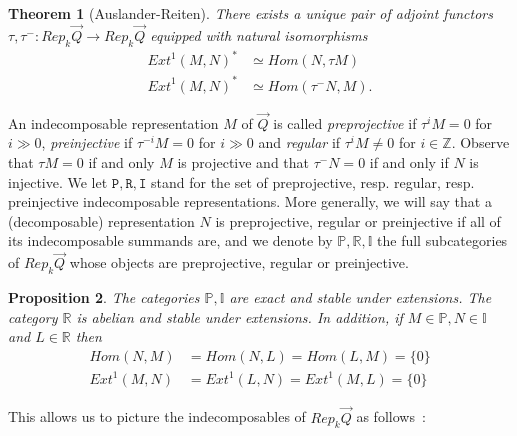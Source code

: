 \documentclass[a4paper,10pt]{amsart}
\def\Z{\mathbb{Z}}
\newtheorem{theo}{\bf{Theorem}}[section]
\newtheorem{prop}[theo]{Proposition}
\numberwithin{equation}{section}
\begin{document}
\begin{theo}[Auslander-Reiten]\label{T:AR} There exists a unique pair of adjoint functors $\tau,\tau^-: Rep_k\vec{Q} \to Rep_k\vec{Q}$ equipped with natural isomorphisms
\begin{align*}
{Ext}^1(M,N)^* &\simeq {Hom}(N,\tau M)\\
{Ext}^1(M,N)^* &\simeq {Hom}(\tau^-N, M).
\end{align*}
\end{theo}

\vspace{.1in}

An indecomposable representation $M$ of $\vec{Q}$ is called \textit{preprojective} if $\tau^i M =0$ for $i \gg 0$,
\textit{preinjective} if $\tau^{-i} M =0$ for $i \gg 0$ and \textit{regular} if $\tau^i M \neq 0$ for $i \in \Z$. 
Observe that $\tau M=0$ if and only $M$ is projective and that $\tau^{-} N=0$ if and only if $N$ is injective.
We let $\texttt{P}, \texttt{R}, \texttt{I}$ stand for the set of preprojective, resp. regular, resp. preinjective indecomposable representations. More generally, we will say that a (decomposable) representation $N$ is preprojective, regular or preinjective if all of its indecomposable summands are, and we denote by $\mathbb{P}, \mathbb{R}, \mathbb{I}$ the full subcategories of $Rep_k\vec{Q}$ whose objects are preprojective, regular or preinjective.

\vspace{.1in}

\begin{prop}\label{P:extiszero} The categories $\mathbb{P},\mathbb{I}$ are exact and stable under extensions. The category $\mathbb{R}$ is abelian and stable under extensions. In addition, if $M \in \mathbb{P}, N \in \mathbb{I}$ and $L \in \mathbb{R}$ then
\begin{align}\label{E:preprojeqs}
{Hom}(N,M) &={Hom}(N,L)={Hom}(L,M)=\{0\}\\
{Ext}^1(M,N)&={Ext}^1(L,N)={Ext}^1(M,L)=\{0\}
\end{align}
\end{prop}

\vspace{.1in}
 
This allows us to picture the indecomposables of $Rep_k\vec{Q}$ as follows~:

\vspace{.2in}
\end{document}
